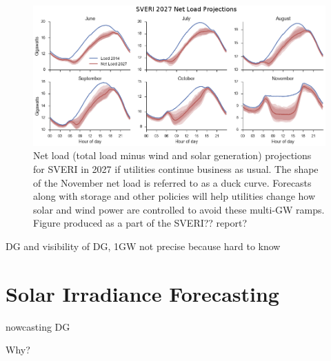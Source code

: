 \begin{figure}[h]
\centering
\includegraphics[width=\textwidth]{figs/duckcurves.png}
\caption[Projected SVERI 2027 duck curves]{Net load (total load minus
  wind and solar generation) projections for SVERI in 2027 if
  utilities continue business as usual. The shape of the November net
  load is referred to as a duck curve. Forecasts along with storage
  and other policies will help utilities change how solar and wind
  power are controlled to avoid these multi-GW ramps. Figure produced
  as a part of the SVERI?? report?}
\label{fig:duckcurves}
\end{figure}



DG and visibility of DG, 1GW not precise because hard to know


\section{Solar Irradiance Forecasting}
nowcasting DG

Why?

